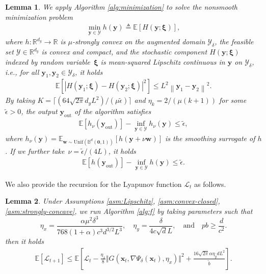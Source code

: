 \documentclass[11pt]{article}
\def\vzero{\mathbf{0}}
\def\vw{\mathbf{w}}
\def\vx{\mathbf{x}}
\def\vy{\mathbf{y}}
\def\vxi{\bm{\xi}}
\def\fL{{\mathcal{L}}}
\def\fY{{\mathcal{Y}}}
\def\BE{{\mathbb{E}}}
\def\BB{{\mathbb{B}}}
\def\BR{{\mathbb{R}}}
\newcommand{\norm}[1]{\left\| #1 \right\|}
\newtheorem{lemma}{Lemma}
\begin{document}
\begin{lemma}\label{thm:zeroth-order minimization}
We apply Algorithm \ref{alg:minimization} to solve the nonsmooth minimization problem
\begin{align*}
    \min_{\vy\in\fY}h(\vy) \triangleq \BE[H(\vy;\vxi)],
\end{align*}
where $h:\BR^{d_y}\to\BR$ is $\mu$-strongly convex on the augmented domain $\fY_\delta$, the feasible set $\fY\in\BR^{d_y}$ is convex and compact, and the stochastic component $H(\vy;\vxi)$ indexed by random variable~$\vxi$ is mean-squared Lipschitz continuous in $\vy$ on $\fY_\delta$, i.e., for all $\vy_1, \vy_2\in\fY_\delta$, it holds 
\begin{align*}
\mathbb{E}\left[|H(\vy_1;\vxi) - H(\vy_2;\vxi)|^2\right] \leq L^2 \norm{\vy_1 - \vy_2}^2.    
\end{align*}
By taking $K=\lceil(64\sqrt{2\pi}d_yL^2)/(\mu\tilde\epsilon)\rceil$ and
$\eta_k=2/(\mu(k+1))$ for some $\tilde\epsilon>0$,
the output $\vy_{\mathrm{out}}$ of the algorithm  satisfies
\begin{align*}
\mathbb{E}[h_\nu(\vy_{\mathrm{out}})]-\inf _{\vy\in \fY} h_\nu(\vy)\le\tilde\epsilon,
\end{align*}
where $h_\nu(\vy)= \BE_{\vw\sim {\mathrm{Unif}}(\BB^{d}(\vzero,1))} [h(\vy+\nu\vw)]$ is the smoothing surrogate of $h$.
If we further take~$\nu={\tilde\epsilon}/(4L)$, it holds
\begin{align*}
\mathbb{E}[h(\vy_{\mathrm{out}})]-\inf _{\vy\in \fY} h(\vy)\le\tilde\epsilon.
\end{align*}   
\end{lemma}



We also provide the recursion for the Lyapunov function $\fL_t$ as follows.

\begin{lemma}\label{update}
Under Assumptions \ref{asm:Lipschitz}, \ref{asm:convex-closed}, \ref{asm:strongly-concave}, we run Algorithm \ref{alg:f} by taking parameters such that
\[\eta_x=\frac{\alpha\mu^2\delta^3}{768(1+\alpha)c^3d^{3/2}L^3},\quad\eta_y=\frac{\delta}{4c\sqrt{d}L}, 
\quad\text{and}\quad
pb\ge\frac{d}{c^2}.
\]
then it holds
\begin{align} \label{ieq:bound-P}
\mathbb{E}[\mathcal L_{t+1}]\leq \mathbb{E}\left[ \mathcal L_t - \frac{ \eta_x}{8} \Vert G(\vx_t,\nabla\Psi_\delta(\vx_t),\eta_x)  \Vert^2 
+\frac{  16\sqrt{2\pi}\alpha \eta_y dL^2}{\tilde{b}}\right].
\end{align}
\end{lemma}
\end{document}
